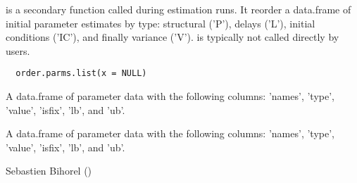 %
\begin{Description}\relax
{} is a secondary function called during estimation runs.
It reorder a data.frame of initial parameter estimates by type: structural
('P'), delays ('L'), initial conditions ('IC'), and finally variance ('V').
 is typically not called directly by users.
\end{Description}
%
\begin{Usage}
\begin{verbatim}
  order.parms.list(x = NULL)
\end{verbatim}
\end{Usage}
%
\begin{Arguments}
\begin{ldescription}
\item[\code{x}] A data.frame of parameter data with the following columns: 'names', 
'type', 'value', 'isfix', 'lb', and 'ub'.
\end{ldescription}
\end{Arguments}
%
\begin{Value}
A data.frame of parameter data with the following columns: 'names', 'type', 
'value', 'isfix', 'lb', and 'ub'.
\end{Value}
%
\begin{Author}\relax
Sebastien Bihorel ()
\end{Author}
